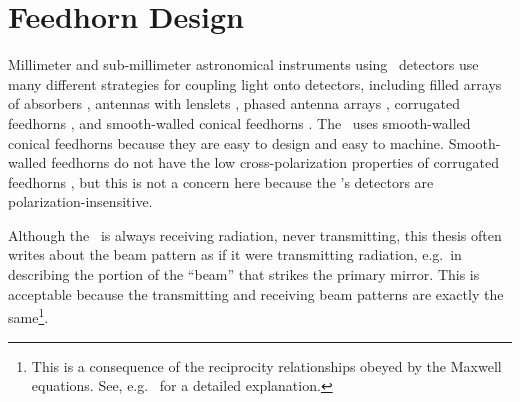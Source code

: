 
\section{Feedhorn Design}\label{sec:ch4-feedhorn-design}


Millimeter and sub-millimeter astronomical instruments using \TES\ detectors use many different strategies for coupling light onto detectors, including filled arrays of absorbers \cite{swetz_overview_2011,holland_scuba-2:_2013}, antennas with lenslets \cite{keating_ultra_2011}, phased antenna arrays \cite{obrient_antenna-coupled_2012}, corrugated feedhorns \cite{austermann_sptpol:_2012,niemack_actpol:_2010}, and smooth-walled conical feedhorns \cite{schwan_invited_2011,carlstrom_10_2011}.
The \Imager\ uses smooth-walled conical feedhorns because they are easy to design and easy to machine.
Smooth-walled feedhorns do not have the low cross-polarization properties of corrugated feedhorns \cite{clarricoats_corrugated_1984}, but this is not a concern here because the \Imager's detectors are polarization-insensitive.

Although the \Imager\ is always receiving radiation, never transmitting, this thesis often writes about the beam pattern as if it were transmitting radiation, e.g.\ in describing the portion of the ``beam'' that strikes the primary mirror.
This is acceptable because the transmitting and receiving beam patterns are exactly the same\footnote{This is a consequence of the reciprocity relationships obeyed by the Maxwell equations. See, e.g.\ \cite{balanis_antenna_2005} for a detailed explanation.}.

